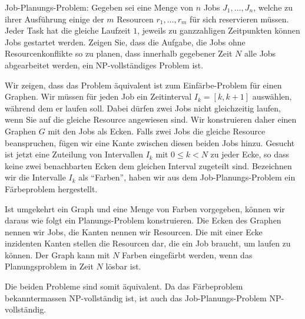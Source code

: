 Job-Planungs-Problem:
Gegeben sei eine Menge von $n$ Jobs $J_1,\dots,J_n$, welche zu ihrer
Ausführung einige der $m$ Resourcen $r_1,\dots,r_m$ für sich reservieren
müssen. Jeder Task hat die gleiche Laufzeit $1$, jeweils zu ganzzahligen
Zeitpunkten können Jobs gestartet werden. Zeigen Sie, dass die
Aufgabe, die Jobs ohne Resourcenkonflikte so zu planen, dass innerhalb
gegebener Zeit $N$ alle Jobs abgearbeitet werden, ein NP-vollständiges Problem
ist.

\begin{loesung}
Wir zeigen, dass das Problem äquivalent ist zum Einfärbe-Problem für
einen Graphen. Wir müssen für jeden Job ein Zeitinterval $I_k=[k,k+1]$
auswählen, während dem er laufen soll. Dabei dürfen zwei Jobs nicht
gleichzeitig laufen, wenn Sie auf die gleiche Resource angewiesen sind.
Wir konstruieren daher einen Graphen $G$ mit den Jobs als Ecken. Falls
zwei Jobs die gleiche Resource beanspruchen, fügen wir eine Kante
zwischen diesen beiden Jobs hinzu. Gesucht ist jetzt eine Zuteilung
von Intervallen $I_k$ mit $0\le k< N$ zu jeder Ecke, so dass keine
zwei benachbarten Ecken dem gleichen Interval zugeteilt sind. Bezeichnen
wir die Intervalle $I_k$ als ``Farben'', haben wir aus dem Job-Planungs-Problem
ein Färbeproblem hergestellt.

Ist umgekehrt ein Graph und eine Menge von Farben vorgegeben, können
wir daraus wie folgt ein Planungs-Problem konstruieren. Die Ecken
des Graphen nennen wir Jobs, die Kanten nennen wir Resourcen. Die
mit einer Ecke inzidenten Kanten stellen die Resourcen dar, die ein
Job braucht, um laufen zu können. Der Graph kann mit $N$ Farben
eingefärbt werden, wenn das Planungsproblem in Zeit $N$ lösbar ist.

Die beiden Probleme sind somit äquivalent. Da das Färbeproblem
bekanntermassen NP-vollständig ist, ist auch das Job-Planungs-Problem
NP-vollständig.
\end{loesung}
